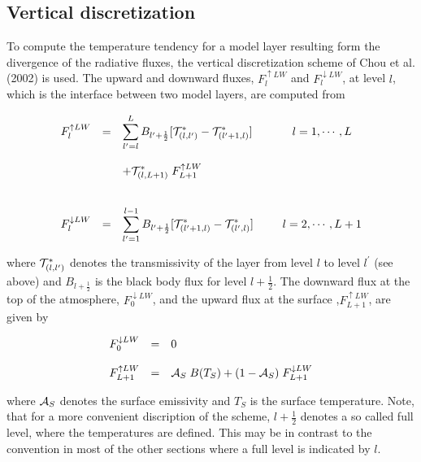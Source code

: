 \subsection*{Vertical discretization}

To compute the temperature tendency for a model
layer  resulting form the divergence of the radiative
fluxes, the vertical discretization scheme of Chou et al. (2002) is used. The upward and
downward fluxes, $F_l^{\uparrow LW}$ and $F_l^{\downarrow LW}$, at
level $l$, which is the interface between two model
layers, are computed from 

\begin{equation}\label{rad1}
\begin{array}{rcllcl}
\displaystyle F_l^{\uparrow LW}& = &\displaystyle  \sum\limits_{l^\prime =
l}^{L} B_{l^\prime+\frac{1}{2}} [{\cal T}^*_{(l ,
l^\prime)}-
{\cal T}^*_{(l^\prime+1,l)}] & & \displaystyle \;\; l=1,  \cdots , L\\
&&&&\\
&& \displaystyle +{\cal T}^*_{(l ,L+1)} \; F_{L+1}^{\uparrow LW} & &\\
& & & &\\
&&&&\\
\displaystyle F_l^{\downarrow LW}& = &\displaystyle 
\sum\limits_{l^\prime=1}^{l-
1} B_{l^\prime+\frac{1}{2}} [{\cal T}^*_{(l^\prime+1,l)}-{\cal T}^*_{(l^\prime,l)}]  & & \displaystyle
\;\; l=2,
\cdots , L+1
\end{array}
\end{equation}

where ${\cal T}^*_{(l,l^{\prime})}$ denotes the
transmissivity of
the layer from level $l$ to level $ l^{\prime}$ (see
above)
and $B_{l+\frac{1}{2}}$ is the black body flux for
level
$l+\frac{1}{2}$.  The downward flux at the top of the atmosphere, $F_0^{\downarrow
LW}$, and the upward flux at the surface ,$F_{L+1}^{\uparrow LW}$, are given by

\begin{equation}
\begin{array}{rcl}
\displaystyle F_0^{\downarrow LW} & = & \displaystyle 0 \\
&&\\
\displaystyle F_{L+1}^{\uparrow LW} & = &  \displaystyle {\cal A}_S \; B(T_S) + (1-{\cal A}_S) \;
F_{L+1}^{\downarrow LW} 
\end{array}
\end{equation}

where ${\cal A}_S$ denotes the surface emissivity and $T_S$ is the surface temperature. Note,
that for a more convenient discription of the scheme,
$l+\frac{1}{2}$
denotes a so called full level, where the temperatures
are
defined. This may be in contrast to the convention in
most of the other sections where a full
level is indicated by $l$.

